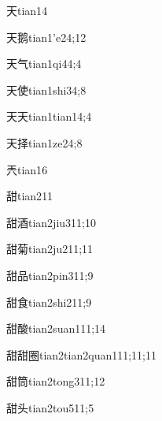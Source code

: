 \begin{verbete}{天}{tian1}{4}
\end{verbete}
\begin{verbete}{天鹅}{tian1'e2}{4;12}
\end{verbete}
\begin{verbete}{天气}{tian1qi4}{4;4}
\end{verbete}
\begin{verbete}{天使}{tian1shi3}{4;8}
\end{verbete}
\begin{verbete}{天天}{tian1tian1}{4;4}
\end{verbete}
\begin{verbete}{天择}{tian1ze2}{4;8}
\end{verbete}
\begin{verbete}{兲}{tian1}{6}
\end{verbete}
\begin{verbete}{甜}{tian2}{11}
\end{verbete}
\begin{verbete}{甜酒}{tian2jiu3}{11;10}
\end{verbete}
\begin{verbete}{甜菊}{tian2ju2}{11;11}
\end{verbete}
\begin{verbete}{甜品}{tian2pin3}{11;9}
\end{verbete}
\begin{verbete}{甜食}{tian2shi2}{11;9}
\end{verbete}
\begin{verbete}{甜酸}{tian2suan1}{11;14}
\end{verbete}
\begin{verbete}{甜甜圈}{tian2tian2quan1}{11;11;11}
\end{verbete}
\begin{verbete}{甜筒}{tian2tong3}{11;12}
\end{verbete}
\begin{verbete}{甜头}{tian2tou5}{11;5}
\end{verbete}
